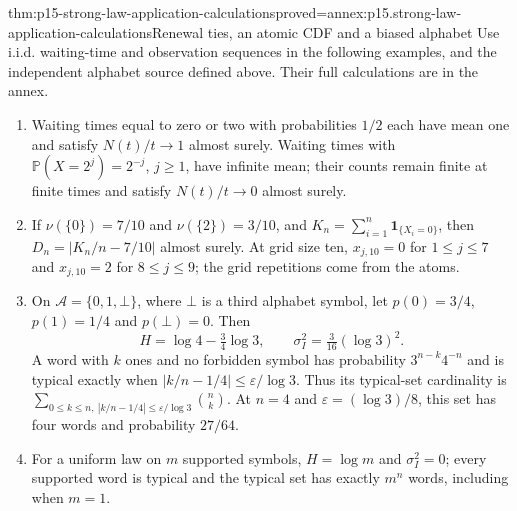 \begin{hbtheorem}{thm:p15-strong-law-application-calculations}{proved=annex:p15.strong-law-application-calculations}{Renewal ties, an atomic CDF and a biased alphabet}
Use i.i.d. waiting-time and observation sequences in the following
examples, and the independent alphabet source defined above. Their full
calculations are in the annex.
\begin{enumerate}
\item Waiting times equal to zero or two with probabilities \(1/2\)
each have mean one and satisfy \(N(t)/t\to1\) almost surely.
Waiting times with \(\mathbb P(X=2^j)=2^{-j}\), \(j\geq1\),
have infinite mean; their counts remain finite at finite times and
satisfy \(N(t)/t\to0\) almost surely.
\item If \(\nu(\{0\})=7/10\) and \(\nu(\{2\})=3/10\), and
\(K_n=\sum_{i=1}^n\mathbf1_{\{X_i=0\}}\), then
\(D_n=|K_n/n-7/10|\) almost surely. At grid size ten,
\(x_{j,10}=0\) for \(1\leq j\leq7\) and \(x_{j,10}=2\)
for \(8\leq j\leq9\); the grid repetitions come from the atoms.
\item On \(\mathcal A=\{0,1,\bot\}\), where \(\bot\) is a third
alphabet symbol, let
\(p(0)=3/4\), \(p(1)=1/4\) and \(p(\bot)=0\). Then
\[
 H=\log4-\tfrac34\log3,\qquad
 \sigma_I^2=\tfrac3{16}(\log3)^2.
\]
A word with \(k\) ones and no forbidden symbol has probability
\(3^{n-k}4^{-n}\) and is typical exactly when
\(|k/n-1/4|\leq\varepsilon/\log3\). Thus its typical-set cardinality is
\(\sum_{0\leq k\leq n,\ |k/n-1/4|\leq\varepsilon/\log3}\binom nk\).
At \(n=4\) and \(\varepsilon=(\log3)/8\), this set has four words
and probability \(27/64\).
\item For a uniform law on \(m\) supported symbols, \(H=\log m\)
and \(\sigma_I^2=0\); every supported word is typical and the
typical set has exactly \(m^n\) words, including when \(m=1\).
\end{enumerate}
\end{hbtheorem}

